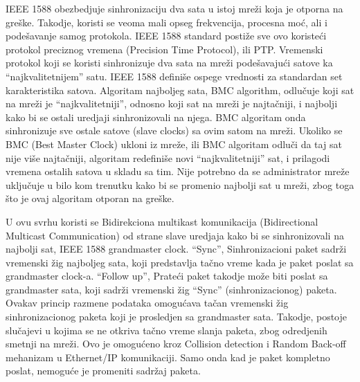 \documentclass[a4paper,12pt, master]{etf}
\begin{document}
	IEEE 1588 obezbedjuje sinhronizaciju dva sata u istoj mre\v{z}i koja je 
	otporna na gre\v{s}ke. Takodje, koristi se veoma mali opseg frekvencija, 
	procesna mo\'{c}, ali i pode\v{s}avanje samog protokola. IEEE 1588 standard 
	posti\v{z}e sve ovo koriste\'{c}i protokol preciznog vremena (Precision 
	Time Protocol), ili PTP\@. Vremenski protokol koji se koristi sinhronizuje 
	dva sata na	mre\v{z}i pode\v{s}avaju\'{c}i satove ka ``najkvalitetnijem'' 
	satu. IEEE 1588	defini\v{s}e ospege vrednosti za standardan set 
	karakteristika satova. Algoritam najboljeg sata, BMC algorithm, 
	odlu\v{c}uje koji sat na mre\v{z}i je ``najkvalitetniji'', odnosno koji sat 
	na mre\v{z}i je najta\v{c}niji, i najbolji kako bi se ostali uredjaji 
	sinhronizovali na njega. BMC algoritam onda sinhronizuje sve ostale satove 
	(slave clocks) sa ovim satom na mre\v{z}i.	Ukoliko se BMC (Best Master 
	Clock) ukloni iz mre\v{z}e, ili BMC algoritam odlu\v{c}i da taj sat
	nije vi\v{s}e najta\v{c}niji, algoritam redefini\v{s}e novi 
	``najkvalitetniji'' sat, i prilagodi vremena ostalih satova u skladu sa 
	tim. Nije potrebno da se administrator mre\v{z}e uklju\v{c}uje u bilo kom 
	trenutku kako bi se promenio najbolji sat u mre\v{z}i, zbog toga \v{s}to je 
	ovaj algoritam otporan na gre\v{s}ke.

	U ovu svrhu koristi se Bidirekciona multikast komunikacija (Bidirectional 
	Multicast Communication) od strane slave uredjaja kako bi se sinhronizovali 
	na najbolji sat, IEEE 1588 grandmaster clock. ``Sync'', Sinhronizacioni 
	paket sadr\v{z}i vremenski \v{z}ig najboljeg sata, koji predstavlja 
	ta\v{c}no vreme kada je paket poslat sa grandmaster clock-a. ``Follow up'', 
	Prate\'{c}i paket takodje mo\v{z}e biti poslat sa grandmaster sata, koji 
	sadr\v{z}i vremenski \v{z}ig ``Sync'' (sinhronizacionog) paketa. Ovakav 
	princip razmene podataka omogu\'{c}ava ta\v{c}an vremenski \v{z}ig 
	sinhronizacionog paketa koji je prosledjen sa grandmaster sata. Takodje, 
	postoje	slu\v{c}ajevi u kojima se ne otkriva ta\v{c}no vreme slanja paketa, 
	zbog odredjenih smetnji na mre\v{z}i. Ovo je omogu\'{c}eno kroz Collision 
	detection i Random Back-off	mehanizam u Ethernet/IP komunikaciji. Samo onda 
	kad je paket kompletno poslat, nemogu\'{c}e	je promeniti sadr\v{z}aj paketa.
\end{document}

